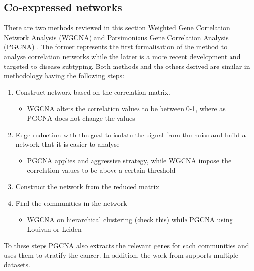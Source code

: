 \subsection{Co-expressed networks} \label{s:lit:co_net}


There are two methods reviewed in this section Weighted Gene Correlation Network Analysis (WGCNA) \citet{Langfelder2008-sn} and Parsimonious Gene Correlation Analysis (PGCNA) \citet{Care2019-ij}. The former represents the first formalisation of the method to analyse correlation networks while the latter is a more recent development and targeted to disease subtyping. Both methods and the others derived are similar in methodology having the following steps:
\begin{enumerate}
    \item Construct network based on the correlation matrix.
    \begin{itemize}
        \item WGCNA alters the correlation values to be between 0-1, where as PGCNA does not change the values 
    \end{itemize}
    \item Edge reduction with the goal to isolate the signal from the noise and build a network that it is easier to analyse
    \begin{itemize}
        \item PGCNA applies and aggressive strategy, while WGCNA impose the correlation values to be above a certain threshold
    \end{itemize}
    \item Construct the network from the reduced matrix
    \item Find the communities in the network
    \begin{itemize}
        \item WGCNA on hierarchical clustering (check this) while PGCNA using Louivan \citet{Blondel2008-ik} or Leiden \citet{Traag2019-ne}
    \end{itemize}
\end{enumerate}

To these steps PGCNA also extracts the relevant genes for each communities and uses them to stratify the cancer. In addition, the work from \citet{Care2019-ij} supports multiple datasets.


